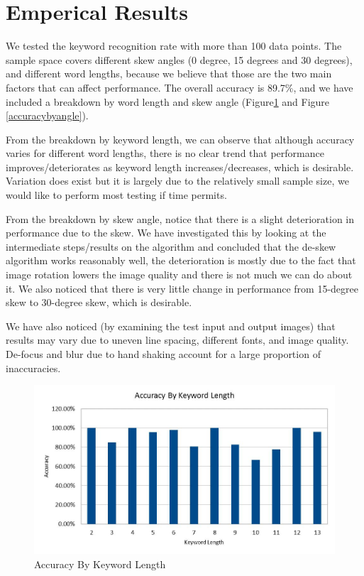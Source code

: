 \documentclass[conference]{IEEEtran}
\begin{document}
\section{Emperical Results}
We tested the keyword recognition rate with more than 100 data points.  The sample space covers different skew angles (0 degree, 15 degrees and 30 degrees), and different word lengths, because we believe that those are the two main factors that can affect performance.    The overall accuracy is 89.7\%, and we have included a breakdown by word length and skew angle (Figure\ref{accuracybylength} and Figure \ref{accuracybyangle}).

From the breakdown by keyword length, we can observe that although accuracy varies for different word lengths, there is no clear trend that performance improves/deteriorates as keyword length increases/decreases, which is desirable.  Variation does exist but it is largely due to the relatively small sample size, we would like to perform most testing if time permits.

From the breakdown by skew angle, notice that there is a slight deterioration in performance due to the skew.  We have investigated this by looking at the intermediate steps/results on the algorithm and concluded that the de-skew algorithm works reasonably well, the deterioration is mostly due to the fact that image rotation lowers the image quality and there is not much we can do about it.  We also noticed that there is very little change in performance from 15-degree skew to 30-degree skew, which is desirable.

We have also noticed (by examining the test input and output images) that results may vary due to uneven line spacing, different fonts, and image quality.  De-focus and blur due to hand shaking account for a large proportion of inaccuracies.

\begin{figure}
\center
\includegraphics[scale=0.25]{accuracy_by_length.jpg}
\caption{Accuracy By Keyword Length}
\label{accuracybylength}
\end{figure}
\end{document}
